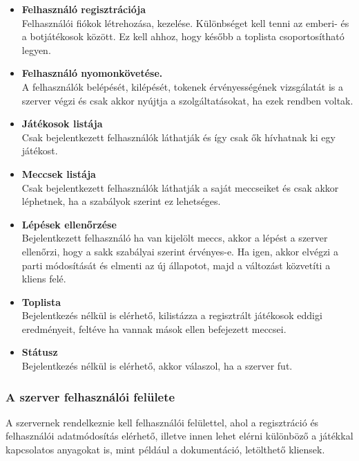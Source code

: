 \documentclass[twoside, a4paper, 12pt]{article}
\begin{document}
\begin{itemize}
	
	\item \textbf{Felhasználó regisztrációja} \\
	Felhasználói fiókok létrehozása, kezelése. Különbséget kell tenni az emberi- és a botjátékosok között. Ez kell ahhoz, hogy később a toplista csoportosítható legyen.
	
	\item \textbf{Felhasználó nyomonkövetése.} \\
	A felhasználók belépését, kilépését, tokenek érvényességének vizsgálatát is a szerver végzi és csak akkor nyújtja a szolgáltatásokat, ha ezek rendben voltak.
	
	\item \textbf{Játékosok listája} \\
	Csak bejelentkezett felhasználók láthatják és így csak ők hívhatnak ki egy játékost.
	
	\item \textbf{Meccsek listája} \\
	Csak bejelentkezett felhasználók láthatják a saját meccseiket és csak akkor léphetnek, ha a szabályok szerint ez lehetséges.
	
	\item \textbf{Lépések ellenőrzése} \\
	Bejelentkezett felhasználó ha van kijelölt meccs, akkor a lépést a szerver ellenőrzi, hogy a sakk szabályai szerint érvényes-e. Ha igen, akkor elvégzi a parti módosítását és elmenti az új állapotot, majd a változást közvetíti a kliens felé.
	
	\item \textbf{Toplista} \\
	Bejelentkezés nélkül is elérhető, kilistázza a regisztrált játékosok eddigi eredményeit, feltéve ha vannak mások ellen befejezett meccsei.
	
	\item \textbf{Státusz} \\
	Bejelentkezés nélkül is elérhető, akkor válaszol, ha a szerver fut.
		
\end{itemize}

\subsubsection{A szerver felhasználói felülete}
A szervernek rendelkeznie kell felhasználói felülettel, ahol a regisztráció és felhasználói adatmódosítás elérhető, illetve innen lehet elérni különböző a játékkal kapcsolatos anyagokat is, mint például a dokumentáció, letölthető kliensek.
\end{document}
